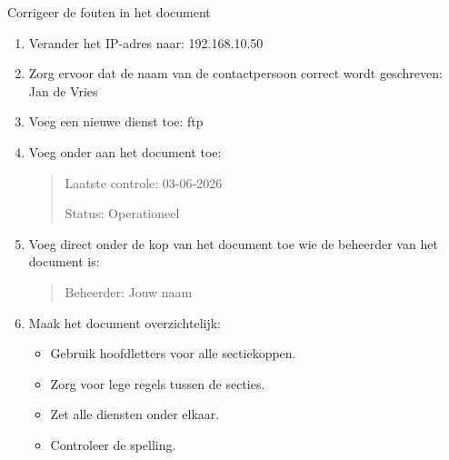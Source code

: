 Corrigeer de fouten in het document

\begin{enumerate}
\item Verander het IP-adres naar: 192.168.10.50
\item Zorg ervoor dat de naam van de contactpersoon correct wordt geschreven: Jan de Vries
\item Voeg een nieuwe dienst toe: ftp
\item Voeg onder aan het document toe:
\begin{quote}
Laatste controle:
03-06-2026

Status:
Operationeel
\end{quote}

\item Voeg direct onder de kop van het document toe wie de beheerder van het document is:
\begin{quote}
Beheerder: Jouw naam
\end{quote}

\item Maak het document overzichtelijk:
    \begin{itemize}
    \item Gebruik hoofdletters voor alle sectiekoppen.
    \item Zorg voor lege regels tussen de secties.
    \item Zet alle diensten onder elkaar.
    \item Controleer de spelling.
    \end{itemize}

\end{enumerate}

